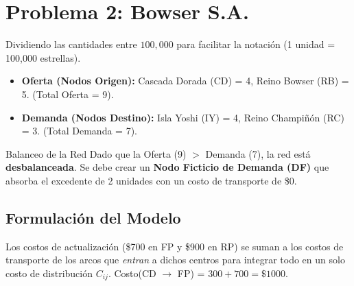 \documentclass[10pt,a4paper]{article}
\begin{document}
\newpage

\section{Problema 2: Bowser S.A.}

Dividiendo las cantidades entre $100,000$ para facilitar 
la notación (1 unidad = 100,000 estrellas).

\begin{itemize}
    \item \textbf{Oferta (Nodos Origen):} Cascada Dorada (CD) = 4, Reino Bowser (RB) = 5. (Total Oferta = 9).
    \item \textbf{Demanda (Nodos Destino):} Isla Yoshi (IY) = 4, Reino Champiñón (RC) = 3. (Total Demanda = 7).
\end{itemize}

\begin{alerta}{Balanceo de la Red}
Dado que la Oferta (9) $>$ Demanda (7), la red está \textbf{desbalanceada}. Se debe crear un \textbf{Nodo Ficticio de Demanda (DF)} que absorba el excedente de 2 unidades con un costo de transporte de \$0.
\end{alerta}

\subsection{Formulación del Modelo}

Los costos de actualización (\$700 en FP y \$900 en RP) se suman a los costos de transporte de los arcos que \textit{entran} 
a dichos centros para integrar todo en un solo costo de distribución $C_{ij}$.
Costo(CD $\to$ FP) = $300 + 700 = \$1000$.
\end{document}
